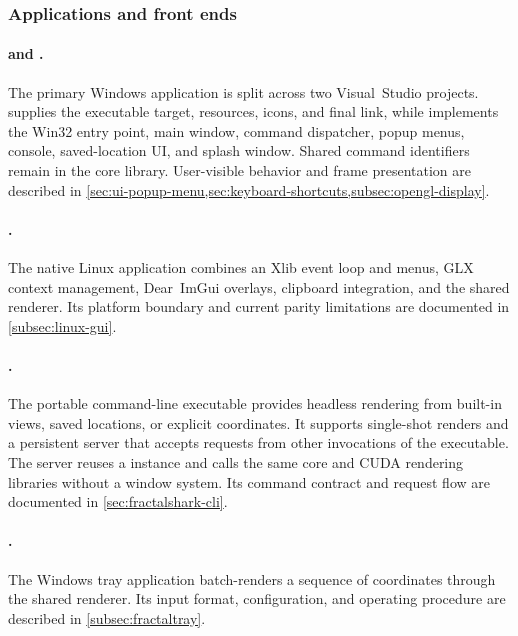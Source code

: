 \subsubsection{Applications and front ends}

\paragraph{ and .}
The primary Windows application is split across two Visual~Studio projects.
 supplies the executable target, resources, icons, and final
link, while  implements the Win32 entry point, main
window, command dispatcher, popup menus, console, saved-location UI, and splash
window.  Shared command identifiers remain in the core library.  User-visible
behavior and frame presentation are described in
\cref{sec:ui-popup-menu,sec:keyboard-shortcuts,subsec:opengl-display}.

\paragraph{.}
The native Linux application combines an Xlib event loop and menus, GLX context
management, Dear~ImGui overlays, clipboard integration, and the shared renderer.
Its platform boundary and current parity limitations are documented in
\cref{subsec:linux-gui}.

\paragraph{.}
The portable command-line executable provides headless rendering from built-in
views, saved locations, or explicit coordinates. It supports single-shot
renders and a persistent server that accepts requests from other invocations
of the executable. The server reuses a  instance and calls the
same core and CUDA rendering libraries without a window system. Its command
contract and request flow are documented in \cref{sec:fractalshark-cli}.

\paragraph{.}
The Windows tray application batch-renders a sequence of coordinates through
the shared renderer.  Its input format, configuration, and operating procedure
are described in \cref{subsec:fractaltray}.


